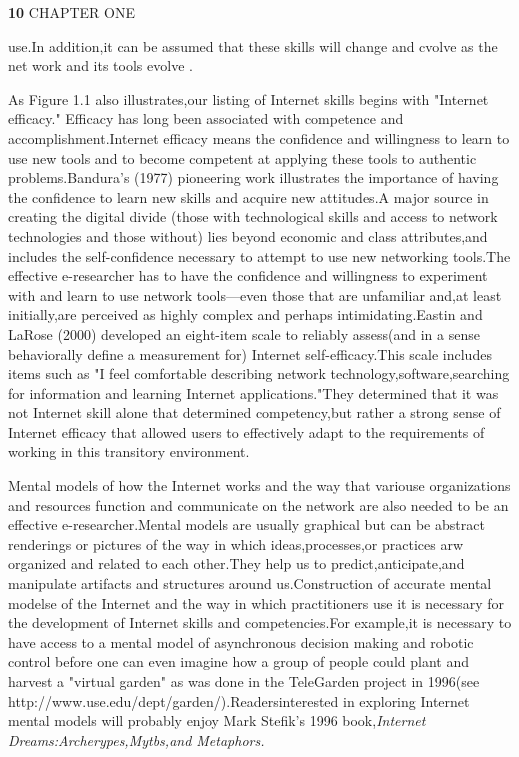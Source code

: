 \documentclass[10pt,a4paper]{book}
\begin{document}
\begin{flushleft}
  \!\!\!\!\!\!\!\!\!\!\!\!\!\!\!\textbf{10} \quad CHAPTER ONE
\end{flushleft}


\!\!\!\!\!\!\!\!\!use.In addition,it can be assumed that these skills will change and cvolve as the net work and its tools evolve .

As Figure 1.1 also illustrates,our listing of Internet skills begins with "Internet efficacy." Efficacy has long been associated with competence and accomplishment.Internet efficacy means the confidence and willingness to learn to use new tools and to become competent at applying these tools to authentic problems.Bandura's (1977) pioneering work illustrates the importance of having the confidence to learn new skills and acquire new attitudes.A major source in creating the digital divide (those with technological skills and access to network technologies and those without) lies beyond economic and class attributes,and includes the self-confidence necessary to attempt to use new networking tools.The effective e-researcher has to have the confidence and willingness to experiment with and learn to use network tools---even those that are unfamiliar and,at least initially,are perceived as highly complex and perhaps intimidating.Eastin and LaRose (2000) developed an eight-item scale to reliably assess(and in a sense behaviorally define a measurement for) Internet self-efficacy.This scale includes items such as "I feel comfortable describing network technology,software,searching for information and learning Internet applications."They determined that it was not Internet skill alone that determined competency,but rather a strong sense of Internet efficacy that allowed users to effectively adapt to the requirements of working in this transitory environment.

Mental models of how the Internet works and the way that variouse organizations and resources function and communicate on the network are also needed to be an effective e-researcher.Mental models are usually graphical but can be abstract renderings or pictures of the way in which ideas,processes,or practices arw organized and related to each other.They help us to predict,anticipate,and manipulate artifacts and structures around us.Construction of accurate mental modelse of the Internet and the way in which practitioners use it is necessary for the development of Internet skills and competencies.For example,it is necessary to have access to a mental model of asynchronous decision making and robotic control before one can even imagine how a group of people could plant and harvest a "virtual garden" as was done in the TeleGarden project in 1996(see http://www.use.edu/dept/garden/).Readersinterested in exploring Internet mental models will probably enjoy Mark Stefik's 1996 book,\emph{\textit{\textmd{Internet Dreams:Archerypes,Mytbs,and Metaphors.}}} 
\end{document}
